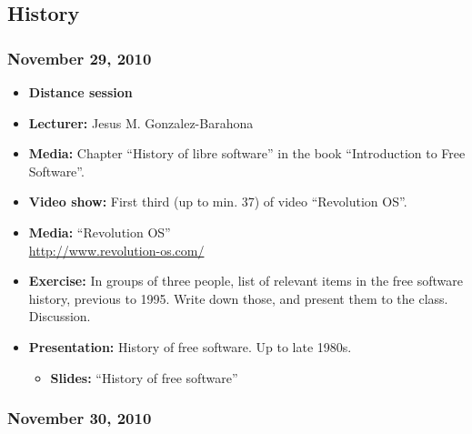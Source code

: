 \documentclass[a4paper]{article}
\begin{document}
\subsection{History}


\subsubsection{November 29, 2010}

\begin{itemize}
\item \textbf{Distance session}
\item \textbf{Lecturer:} Jesus M. Gonzalez-Barahona
\item \textbf{Media:} Chapter ``History of libre software'' in the book ``Introduction to Free Software''.

\item \textbf{Video show:} First third (up to min. 37) of video ``Revolution OS''.
\item \textbf{Media:} ``Revolution OS'' \\
  \url{http://www.revolution-os.com/}

\item \textbf{Exercise:} In groups of three people, list of relevant items in the free software history, previous to 1995. Write down those, and present them to the class. Discussion.
\item \textbf{Presentation:} History of free software. Up to late 1980s.
  \begin{itemize}
  \item \textbf{Slides:} ``History of free software''
  \end{itemize}
\end{itemize}

\subsubsection{November 30, 2010}
\end{document}
